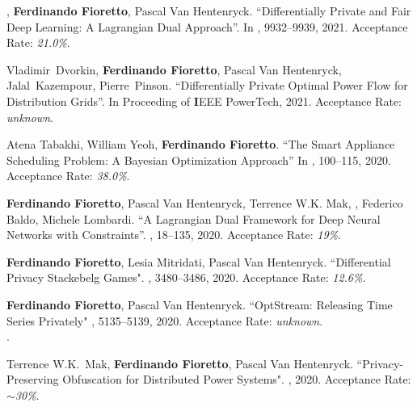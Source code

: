 	\item {}, {\bf Ferdinando Fioretto}, Pascal Van Hentenryck.
	{``Differentially Private and Fair Deep Learning: A Lagrangian Dual Approach''}.
	In \procAAAI, 9932--9939, 2021.
    Acceptance Rate: {\it 21.0\%}. %

 \item Vladimir~Dvorkin, {\bf Ferdinando Fioretto}, Pascal Van Hentenryck, Jalal~Kazempour, Pierre~Pinson.
	{``Differentially Private Optimal Power Flow for Distribution Grids''}. 
	In Proceeding of {\textbf IEEE PowerTech}, 2021.
	Acceptance Rate: {\it unknown}. %

    \item 
    Atena Tabakhi, William Yeoh, {\bf Ferdinando Fioretto}.
    {``The Smart Appliance Scheduling Problem: A Bayesian Optimization Approach''}
    In \procPRIMA, 100--115, 2020.
    Acceptance Rate: {\it 38.0\%}. %

	\item {\bf Ferdinando Fioretto}, Pascal Van Hentenryck, Terrence W.K. Mak, , Federico Baldo, Michele Lombardi. 
	{``A Lagrangian Dual Framework for Deep Neural Networks with Constraints''}. 
	\emph{\procECML}, 18--135, 2020. 
	Acceptance Rate: {\it 19\%}.

\item 
	{\bf Ferdinando Fioretto}, Lesia Mitridati, Pascal Van Hentenryck.
	{``Differential Privacy Stackebelg Games"}.
	\emph{\procIJCAI}, 3480--3486, 2020.
    Acceptance Rate: {\it 12.6\%}. 

\item 
	{\bf Ferdinando Fioretto}, Pascal Van Hentenryck.
	{``OptStream: Releasing Time Series Privately"}
	\emph{\procIJCAI}, 5135--5139, 2020.
    Acceptance Rate: {\it unknown}. \\
    .

\item 
	Terrence W.K.~Mak, {\bf Ferdinando Fioretto}, Pascal Van Hentenryck.
	{``Privacy-Preserving Obfuscation for Distributed Power Systems"}.
	\emph{\procPSCC}, 2020.
    Acceptance Rate: {\it $\sim$30\%}. %

